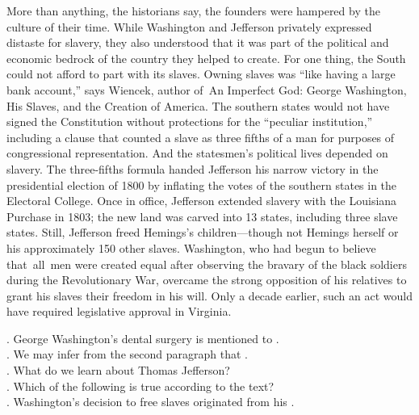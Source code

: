 More than anything, the historians say, the founders were hampered by the culture of their time. While Washington and Jefferson privately expressed distaste for slavery, they also understood that it was part of the political and economic bedrock of the country they helped to create.
For one thing, the South could not afford to part with its slaves. Owning slaves was “like having a large bank account,” says Wiencek, author of An Imperfect God: George Washington, His Slaves, and the Creation of America. The southern states would not have signed the Constitution without protections for the “peculiar institution,” including a clause that counted a slave as three fifths of a man for purposes of congressional representation.
And the statesmen’s political lives depended on slavery. The three-fifths formula handed Jefferson his narrow victory in the presidential election of 1800 by inflating the votes of the southern states in the Electoral College. Once in office, Jefferson extended slavery with the Louisiana Purchase in 1803; the new land was carved into 13 states, including three slave states.
Still, Jefferson freed Hemings’s children—though not Hemings herself or his approximately 150 other slaves. Washington, who had begun to believe that all men were created equal after observing the bravary of the black soldiers during the Revolutionary War, overcame the strong opposition of his relatives to grant his slaves their freedom in his will. Only a decade earlier, such an act would have required legislative approval in Virginia.
\begin{questions} . George Washington’s dental surgery is mentioned to .
\\ . We may infer from the second paragraph that .
\\ . What do we learn about Thomas Jefferson?
\\ . Which of the following is true according to the text?
\\ . Washington’s decision to free slaves originated from his .
\\ \end{questions}    